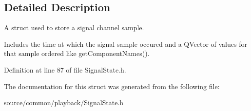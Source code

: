 \subsection{Detailed Description}
A struct used to store a signal channel sample. 

Includes the time at which the signal sample occured and a Q\-Vector of values for that sample ordered like get\-Component\-Names(). 

Definition at line 87 of file Signal\-State.\-h.



The documentation for this struct was generated from the following file\-:\begin{DoxyCompactItemize}
\item 
source/common/playback/Signal\-State.\-h\end{DoxyCompactItemize}
